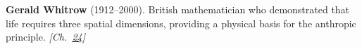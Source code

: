 \textbf{Gerald Whitrow} (1912–2000). British mathematician who demonstrated that life requires three spatial dimensions, providing a physical basis for the anthropic principle. \emph{[Ch.~\hyperref[ch:4dspacetime]{24}]}

